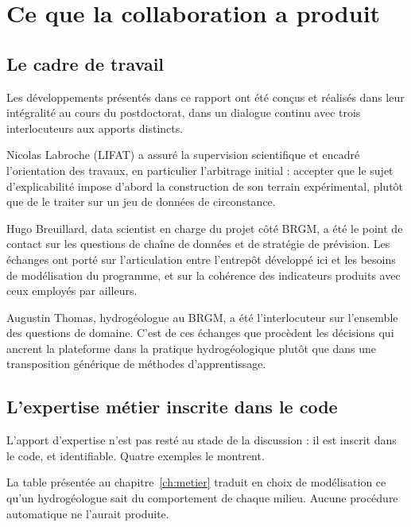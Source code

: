 \chapter{Ce que la collaboration a produit}
\label{ch:collaborations}



\section{Le cadre de travail}

Les développements présentés dans ce rapport ont été conçus et réalisés dans leur intégralité au
cours du postdoctorat, dans un dialogue continu avec trois interlocuteurs aux apports distincts.

Nicolas Labroche (LIFAT) a assuré la supervision scientifique et encadré l'orientation des
travaux, en particulier l'arbitrage initial : accepter que le sujet d'explicabilité impose
d'abord la construction de son terrain expérimental, plutôt que de le traiter sur un jeu de
données de circonstance.

Hugo Breuillard, data scientist en charge du projet côté BRGM, a été le point de contact sur les
questions de chaîne de données et de stratégie de prévision. Les échanges ont porté sur
l'articulation entre l'entrepôt développé ici et les besoins de modélisation du programme, et
sur la cohérence des indicateurs produits avec ceux employés par ailleurs.

Augustin Thomas, hydrogéologue au BRGM, a été l'interlocuteur sur l'ensemble des questions de
domaine. C'est de ces échanges que procèdent les décisions qui ancrent la plateforme dans la
pratique hydrogéologique plutôt que dans une transposition générique de méthodes
d'apprentissage.

\section{L'expertise métier inscrite dans le code}
\label{sec:apport-metier}

L'apport d'expertise n'est pas resté au stade de la discussion : il est inscrit dans le code, et
identifiable. Quatre exemples le montrent.

La table présentée au chapitre~\ref{ch:metier} traduit en choix de modélisation ce qu'un hydrogéologue sait du
comportement de chaque milieu. Aucune procédure automatique ne l'aurait produite.

